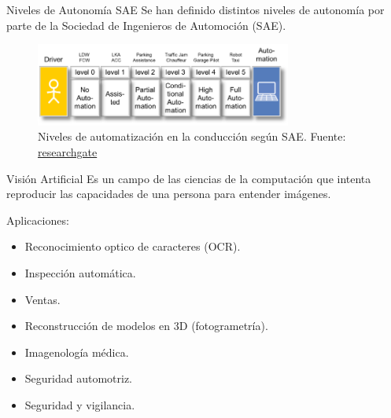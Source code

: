 \documentclass[10pt]{beamer}
\begin{document}
\begin{frame}{Niveles de Autonomía SAE}
    Se han definido distintos niveles de autonomía por parte de la Sociedad de Ingenieros de Automoción (SAE).
    \begin{figure}[!h] 
        \centering
        \includegraphics[width=0.75\textwidth]{../img/levels}
        \caption[Niveles de automatización SAE]{Niveles de automatización en la conducción según SAE. 
        Fuente: \href{https://www.researchgate.net/figure/Terms-related-to-automated-driving-according-to-SAE-and-VDA_fig1_273883061}{researchgate} }
\end{figure}
\end{frame}

\begin{frame}{Visión Artificial}
    Es un campo de las ciencias de la computación que intenta reproducir las capacidades de una persona para entender imágenes.
    
    Aplicaciones:
    \begin{itemize}
        \item Reconocimiento optico de caracteres (OCR).
        \item Inspección automática.
        \item Ventas.
        \item Reconstrucción de modelos en 3D (fotogrametría).
        \item Imagenología médica.
        \item Seguridad automotriz.
        \item Seguridad y vigilancia.
    \end{itemize}
\end{frame}
\end{document}
